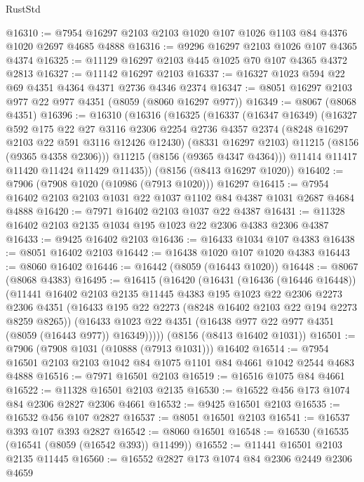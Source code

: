 \begin{lexlean}{RustStd}
\begin{coremodule}
{\begin{coremodule}
{{{{{{{{{{{{{{{{{{{{{{{{{{{{{{{{{{@16310 := @7954 @16297 @2103 @2103 @1020 @107 @1026 @1103 @84 @4376 @1020 @2697 @4685 @4888
@16316 := @9296 @16297 @2103 @1026 @107 @4365 @4374
@16325 := @11129 @16297 @2103 @445 @1025 @70 @107 @4365 @4372 @2813
@16327 := @11142 @16297 @2103
@16337 := @16327 @1023 @594 @22 @69 @4351 @4364 @4371 @2736 @4346 @2374
@16347 := @8051 @16297 @2103 @977 @22 @977 @4351 (@8059 (@8060 @16297 @977))
@16349 := @8067 (@8068 @4351)
@16396 := @16310
    (@16316
      (@16325
        (@16337
          (@16347 @16349)
          (@16327
            @592
            @175
            @22
            @27
            @3116
            @2306
            @2254
            @2736
            @4357
            @2374
            (@8248 @16297 @2103 @22 @591 @3116 @12426 @12430)
            (@8331 @16297 @2103)
            @11215
            (@8156 (@9365 @4358 @2306)))
          @11215
          (@8156 (@9365 @4347 @4364)))
        @11414
        @11417
        @11420
        @11424
        @11429
        @11435))
    (@8156 (@8413 @16297 @1020))
@16402 := @7906 (@7908 @1020 (@10986 (@7913 @1020))) @16297
@16415 := @7954 @16402 @2103 @2103 @1031 @22 @1037 @1102 @84 @4387 @1031 @2687 @4684 @4888
@16420 := @7971 @16402 @2103 @1037 @22 @4387
@16431 := @11328 @16402 @2103 @2135 @1034 @195 @1023 @22 @2306 @4383 @2306 @4387
@16433 := @9425 @16402 @2103
@16436 := @16433 @1034 @107 @4383
@16438 := @8051 @16402 @2103
@16442 := @16438 @1020 @107 @1020 @4383
@16443 := @8060 @16402
@16446 := @16442 (@8059 (@16443 @1020))
@16448 := @8067 (@8068 @4383)
@16495 := @16415
    (@16420
      (@16431
        (@16436 (@16446 @16448))
        (@11441
          @16402
          @2103
          @2135
          @11445
          @4383
          @195
          @1023
          @22
          @2306
          @2273
          @2306
          @4351
          (@16433 @195 @22 @2273 (@8248 @16402 @2103 @22 @194 @2273 @8259 @8265))
          (@16433 @1023 @22 @4351 (@16438 @977 @22 @977 @4351 (@8059 (@16443 @977)) @16349)))))
    (@8156 (@8413 @16402 @1031))
@16501 := @7906 (@7908 @1031 (@10888 (@7913 @1031))) @16402
@16514 := @7954 @16501 @2103 @2103 @1042 @84 @1075 @1101 @84 @4661 @1042 @2544 @4683 @4888
@16516 := @7971 @16501 @2103
@16519 := @16516 @1075 @84 @4661
@16522 := @11328 @16501 @2103 @2135
@16530 := @16522 @456 @173 @1074 @84 @2306 @2827 @2306 @4661
@16532 := @9425 @16501 @2103
@16535 := @16532 @456 @107 @2827
@16537 := @8051 @16501 @2103
@16541 := @16537 @393 @107 @393 @2827
@16542 := @8060 @16501
@16548 := @16530 (@16535 (@16541 (@8059 (@16542 @393)) @11499))
@16552 := @11441 @16501 @2103 @2135 @11445
@16560 := @16552 @2827 @173 @1074 @84 @2306 @2449 @2306 @4659
}}}}}}}}}}}}}}}}}}}}}}}}}}}}}}}}}}
\end{coremodule}}
\end{coremodule}
\end{lexlean}
